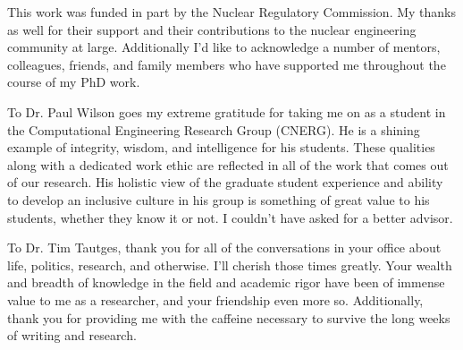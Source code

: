 



This work was funded in part by the Nuclear Regulatory Commission. My thanks as
well for their support and their contributions to the nuclear engineering
community at large. Additionally I'd like to acknowledge a number of mentors, colleagues,
friends, and family members who have supported me throughout the
course of my PhD work.

To Dr. Paul Wilson goes my extreme gratitude for taking me on as a student in
the Computational Engineering Research Group (CNERG). He is a shining example of
integrity, wisdom, and intelligence for his students. These qualities along with
a dedicated work ethic are reflected in all of the work that comes out of our
research. His holistic view of the graduate student experience and ability to
develop an inclusive culture in his group is something of great value to his
students, whether they know it or not. I couldn't have asked for a better
advisor.

To Dr. Tim Tautges, thank you for all of the conversations in your office about
life, politics, research, and otherwise. I'll cherish those times greatly. Your
wealth and breadth of knowledge in the field and academic rigor have been of
immense value to me as a researcher, and your friendship even more
so. Additionally, thank you for providing me with the caffeine necessary to
survive the long weeks of writing and research.

